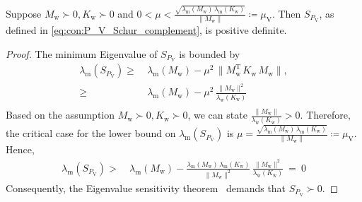 \begin{lemma}\label{lemma:con:P_V_Schur_complement_positive_definite}
    Suppose $M_\mathrm{w} \succ 0, K_\mathrm{w} \succ 0$ and $0 < \mu < \frac{\sqrt{\lambda_\mathrm{m}(M_\mathrm{w}) \, \lambda_\mathrm{m}\left(K_\mathrm{w}\right)}}{\lVert M_\mathrm{w} \rVert} \coloneqq \mu_\mathrm{V}$. Then $S_{P_\mathrm{V}}$, as defined in \eqref{eq:con:P_V_Schur_complement}, is positive definite.
\end{lemma}
\begin{proof}
    The minimum Eigenvalue of $S_{P_\mathrm{V}}$ is bounded by
    \begin{equation}
    \begin{split}
        \lambda_\mathrm{m}(S_{P_\mathrm{V}}) \geq& \: \lambda_\mathrm{m}(M_\mathrm{w}) - \mu^2 \, \lVert M_\mathrm{w}^\mathrm{T} \, K_\mathrm{w} \, M_\mathrm{w} \rVert,\\
        \geq& \: \lambda_\mathrm{m}(M_\mathrm{w}) - \mu^2 \, \frac{\lVert M_\mathrm{w} \rVert^2}{\lambda_\mathrm{w} \left (K_\mathrm{w} \right )}\\
    \end{split}
    \end{equation}
    Based on the assumption $M_\mathrm{w} \succ 0, K_\mathrm{w} \succ 0$, we can state $\frac{\lVert M_\mathrm{w} \rVert}{\lambda_\mathrm{w}(K_\mathrm{w})} > 0$. Therefore, the critical case for the lower bound on $\lambda_\mathrm{m}(S_{P_\mathrm{V}})$ is $
    \mu = \frac{\sqrt{\lambda_\mathrm{m}(M_\mathrm{w}) \, \lambda_\mathrm{m}\left(K_\mathrm{w}\right)}}{\lVert M_\mathrm{w} \rVert} \coloneqq \mu_\mathrm{V}$. Hence,
    \begin{equation}
    \begin{split}
        \lambda_\mathrm{m}(S_{P_\mathrm{V}}) >& \: \lambda_\mathrm{m}(M_\mathrm{w}) - \frac{\lambda_\mathrm{m}(M_\mathrm{w}) \, \lambda_\mathrm{m}\left(K_\mathrm{w}\right)}{\lVert M_\mathrm{w} \rVert^2} \, \frac{\lVert M_\mathrm{w} \rVert^2}{\lambda_\mathrm{w}(K_\mathrm{w})} \: = \: 0
    \end{split}
    \end{equation}
    Consequently, the Eigenvalue sensitivity theorem~\citep{golub2013matrix} demands that $S_{P_\mathrm{V}} \succ 0$.
\end{proof}

